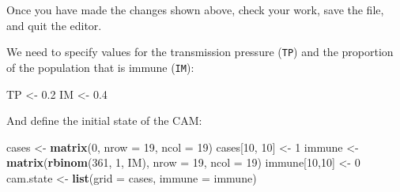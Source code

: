 \documentclass[12pt,a4paper]{book}
\newenvironment{Shaded}{\begin{snugshade}}{\end{snugshade}}
\newcommand{\KeywordTok}[1]{\textcolor[rgb]{0.13,0.29,0.53}{\textbf{#1}}}
\newcommand{\DataTypeTok}[1]{\textcolor[rgb]{0.13,0.29,0.53}{#1}}
\newcommand{\DecValTok}[1]{\textcolor[rgb]{0.00,0.00,0.81}{#1}}
\newcommand{\FloatTok}[1]{\textcolor[rgb]{0.00,0.00,0.81}{#1}}
\newcommand{\StringTok}[1]{\textcolor[rgb]{0.31,0.60,0.02}{#1}}
\newcommand{\ControlFlowTok}[1]{\textcolor[rgb]{0.13,0.29,0.53}{\textbf{#1}}}
\newcommand{\OperatorTok}[1]{\textcolor[rgb]{0.81,0.36,0.00}{\textbf{#1}}}
\newcommand{\NormalTok}[1]{#1}
\theoremstyle{definition}
\theoremstyle{definition}
\theoremstyle{definition}
\theoremstyle{remark}
\begin{document}
\begin{Shaded}
\end{Shaded}

Once you have made the changes shown above, check your work, save the
file, and quit the editor.

We need to specify values for the transmission pressure (\texttt{TP})
and the proportion of the population that is immune (\texttt{IM}):

\begin{Shaded}
\begin{Highlighting}[]
\NormalTok{TP <-}\StringTok{ }\FloatTok{0.2}
\NormalTok{IM <-}\StringTok{ }\FloatTok{0.4}
\end{Highlighting}
\end{Shaded}

And define the initial state of the CAM:

\begin{Shaded}
\begin{Highlighting}[]
\NormalTok{cases <-}\StringTok{ }\KeywordTok{matrix}\NormalTok{(}\DecValTok{0}\NormalTok{, }\DataTypeTok{nrow =} \DecValTok{19}\NormalTok{, }\DataTypeTok{ncol =} \DecValTok{19}\NormalTok{)}
\NormalTok{cases[}\DecValTok{10}\NormalTok{, }\DecValTok{10}\NormalTok{] <-}\StringTok{ }\DecValTok{1}
\NormalTok{immune <-}\StringTok{ }\KeywordTok{matrix}\NormalTok{(}\KeywordTok{rbinom}\NormalTok{(}\DecValTok{361}\NormalTok{, }\DecValTok{1}\NormalTok{, IM), }\DataTypeTok{nrow =} \DecValTok{19}\NormalTok{, }\DataTypeTok{ncol =} \DecValTok{19}\NormalTok{)}
\NormalTok{immune[}\DecValTok{10}\NormalTok{,}\DecValTok{10}\NormalTok{] <-}\StringTok{ }\DecValTok{0}
\NormalTok{cam.state <-}\StringTok{ }\KeywordTok{list}\NormalTok{(}\DataTypeTok{grid =}\NormalTok{ cases, }\DataTypeTok{immune =}\NormalTok{ immune)}
\end{Highlighting}
\end{Shaded}
\end{document}
